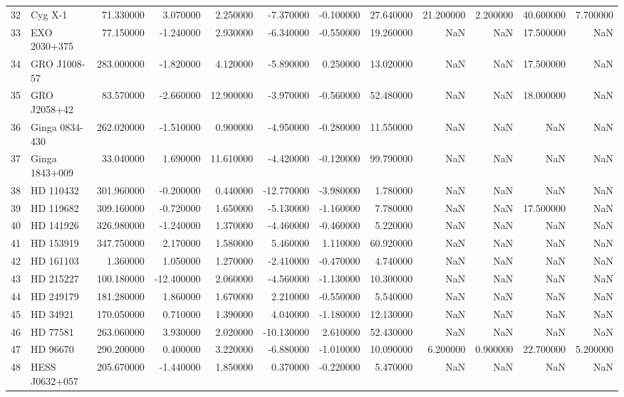 \begin{tabular}{llrrrrrrrrrr}
32 & Cyg X-1 & 71.330000 & 3.070000 & 2.250000 & -7.370000 & -0.100000 & 27.640000 & 21.200000 & 2.200000 & 40.600000 & 7.700000 \\
33 & EXO 2030+375 & 77.150000 & -1.240000 & 2.930000 & -6.340000 & -0.550000 & 19.260000 & NaN & NaN & 17.500000 & NaN \\
34 & GRO J1008-57 & 283.000000 & -1.820000 & 4.120000 & -5.890000 & 0.250000 & 13.020000 & NaN & NaN & 17.500000 & NaN \\
35 & GRO J2058+42 & 83.570000 & -2.660000 & 12.900000 & -3.970000 & -0.560000 & 52.480000 & NaN & NaN & 18.000000 & NaN \\
36 & Ginga 0834-430 & 262.020000 & -1.510000 & 0.900000 & -4.950000 & -0.280000 & 11.550000 & NaN & NaN & NaN & NaN \\
37 & Ginga 1843+009 & 33.040000 & 1.690000 & 11.610000 & -4.420000 & -0.120000 & 99.790000 & NaN & NaN & NaN & NaN \\
38 & HD 110432 & 301.960000 & -0.200000 & 0.440000 & -12.770000 & -3.980000 & 1.780000 & NaN & NaN & NaN & NaN \\
39 & HD 119682 & 309.160000 & -0.720000 & 1.650000 & -5.130000 & -1.160000 & 7.780000 & NaN & NaN & 17.500000 & NaN \\
40 & HD 141926 & 326.980000 & -1.240000 & 1.370000 & -4.460000 & -0.460000 & 5.220000 & NaN & NaN & NaN & NaN \\
41 & HD 153919 & 347.750000 & 2.170000 & 1.580000 & 5.460000 & 1.110000 & 60.920000 & NaN & NaN & NaN & NaN \\
42 & HD 161103 & 1.360000 & 1.050000 & 1.270000 & -2.410000 & -0.470000 & 4.740000 & NaN & NaN & NaN & NaN \\
43 & HD 215227 & 100.180000 & -12.400000 & 2.060000 & -4.560000 & -1.130000 & 10.300000 & NaN & NaN & NaN & NaN \\
44 & HD 249179 & 181.280000 & 1.860000 & 1.670000 & 2.210000 & -0.550000 & 5.540000 & NaN & NaN & NaN & NaN \\
45 & HD 34921 & 170.050000 & 0.710000 & 1.390000 & 4.040000 & -1.180000 & 12.130000 & NaN & NaN & NaN & NaN \\
46 & HD 77581 & 263.060000 & 3.930000 & 2.020000 & -10.130000 & 2.610000 & 52.430000 & NaN & NaN & NaN & NaN \\
47 & HD 96670 & 290.200000 & 0.400000 & 3.220000 & -6.880000 & -1.010000 & 10.090000 & 6.200000 & 0.900000 & 22.700000 & 5.200000 \\
48 & HESS J0632+057 & 205.670000 & -1.440000 & 1.850000 & 0.370000 & -0.220000 & 5.470000 & NaN & NaN & NaN & NaN \\

\end{tabular}
